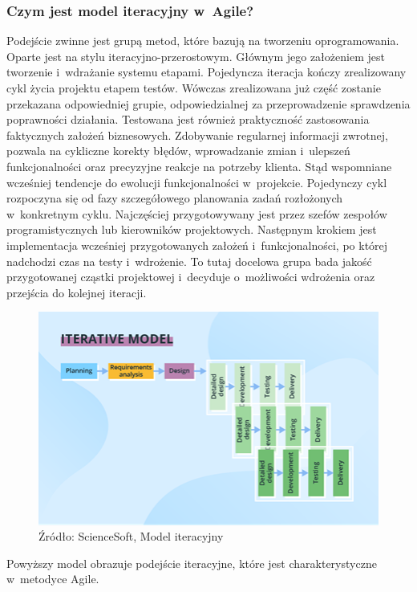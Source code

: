 \documentclass[oneside,polski,logo]{amuthesis}
\begin{document}
\subsubsection{Czym jest model iteracyjny w~Agile?}
Podejście zwinne jest grupą metod, które bazują na tworzeniu oprogramowania. Oparte jest na stylu iteracyjno-przerostowym. Głównym jego założeniem jest tworzenie i~wdrażanie systemu etapami. Pojedyncza iteracja kończy zrealizowany cykl życia projektu etapem testów. Wówczas zrealizowana już część zostanie przekazana odpowiedniej grupie, odpowiedzialnej za przeprowadzenie sprawdzenia poprawności działania. Testowana jest również praktyczność zastosowania faktycznych założeń biznesowych. Zdobywanie regularnej informacji zwrotnej, pozwala na cykliczne korekty błędów, wprowadzanie zmian i~ulepszeń funkcjonalności oraz precyzyjne reakcje na potrzeby klienta. Stąd wspomniane wcześniej tendencje do ewolucji funkcjonalności w~projekcie. Pojedynczy cykl rozpoczyna się od fazy szczegółowego planowania zadań rozłożonych w~konkretnym cyklu. Najczęściej przygotowywany jest przez szefów zespołów programistycznych lub kierowników projektowych. Następnym krokiem jest implementacja wcześniej przygotowanych założeń i~funkcjonalności, po której nadchodzi czas na testy i~wdrożenie. To tutaj docelowa grupa bada jakość przygotowanej cząstki projektowej i~decyduje o~możliwości wdrożenia oraz przejścia do kolejnej iteracji.

\begin{figure}[h]
	\centering
	\includegraphics[width=13cm]{images/hyps/iterative-model.png}
	\caption{Źródło: ScienceSoft, Model iteracyjny \cite{wykresy}}
\end{figure}

Powyższy model obrazuje podejście iteracyjne, które jest charakterystyczne w~metodyce Agile.
\end{document}
